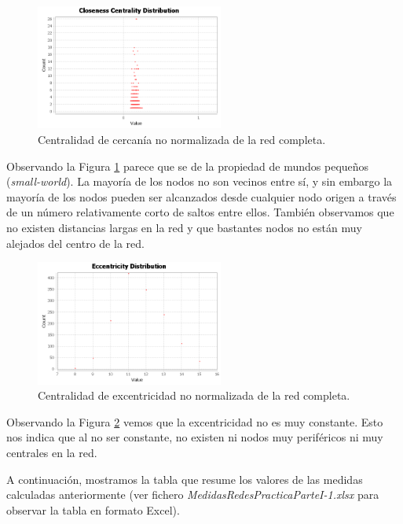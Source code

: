 \documentclass{uimppracticas}
\begin{document}
\begin{figure}[H]
	\centering
	\includegraphics[width=0.55\textwidth]{images/Closeness-Centrality-Distribution}
	\caption{Centralidad de cercanía no normalizada de la red completa.}
	\label{Closeness-Centrality-Distribution}
\end{figure}

Observando la Figura \ref{Closeness-Centrality-Distribution} parece que se de la propiedad de mundos pequeños (\textit{small-world}). La mayoría de los nodos no son vecinos entre sí, y sin embargo la mayoría de los nodos pueden ser alcanzados desde cualquier nodo origen a través de un número relativamente corto de saltos entre ellos. También observamos que no existen distancias largas en la red y que bastantes nodos no están muy alejados del centro de la red.

\begin{figure}[H]
	\centering
	\includegraphics[width=0.55\textwidth]{images/Eccentricity-Distribution}
	\caption{Centralidad de excentricidad no normalizada de la red completa.}
	\label{Eccentricity-Distribution}
\end{figure}

Observando la Figura \ref{Eccentricity-Distribution} vemos que la excentricidad no es muy constante. Esto nos indica que al no ser constante, no existen ni nodos muy periféricos ni muy centrales en la red.

A continuación, mostramos la tabla que resume los valores de las medidas calculadas anteriormente (ver fichero \textit{MedidasRedesPracticaParteI-1.xlsx} para observar la tabla en formato Excel).
\end{document}
